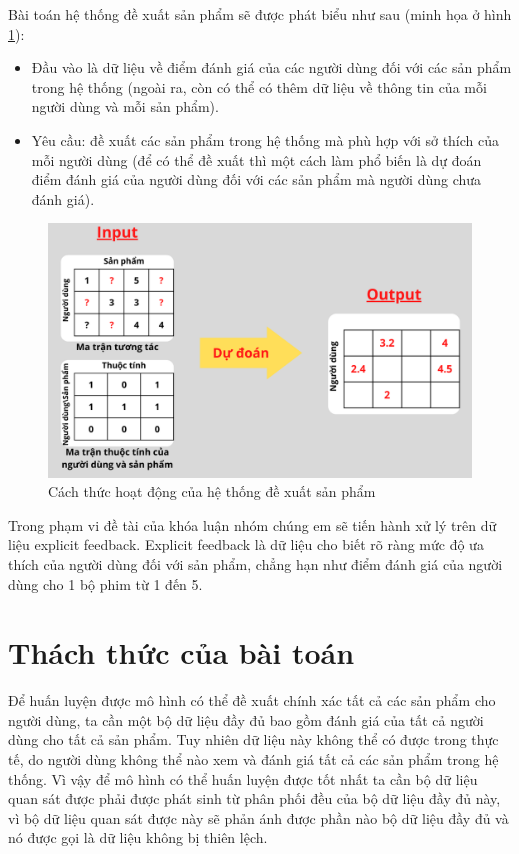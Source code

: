 Bài toán hệ thống đề xuất sản phẩm sẽ được phát biểu như sau (minh họa ở hình \ref{fig:chap1_rs}):
\begin{itemize}
    \item Đầu vào là dữ liệu về điểm đánh giá của các người dùng đối với các sản phẩm trong hệ thống (ngoài ra, còn có thể có thêm dữ liệu về thông tin của mỗi người dùng và mỗi sản phẩm).
    \item Yêu cầu: đề xuất các sản phẩm trong hệ thống mà phù hợp với sở thích của mỗi người dùng (để có thể đề xuất thì một cách làm phổ biến là dự đoán điểm đánh giá của người dùng đối với các sản phẩm mà người dùng chưa đánh giá).
\end{itemize}

\begin{figure}[h]
    \centering
    \includegraphics[width=\textwidth]{Chapter1/RS.png}
    \caption{Cách thức hoạt động của hệ thống đề xuất sản phẩm}
    \label{fig:chap1_rs}
\end{figure}

Trong phạm vi đề tài của khóa luận nhóm chúng em sẽ tiến hành xử lý trên dữ liệu explicit feedback. Explicit feedback là dữ liệu cho biết rõ ràng mức độ ưa thích của người dùng đối với sản phẩm, chẳng hạn như điểm đánh giá của người dùng cho 1 bộ phim từ 1 đến 5. 


\section{Thách thức của bài toán}
Để huấn luyện được mô hình có thể đề xuất chính xác tất cả các sản phẩm cho người dùng, ta cần một bộ dữ liệu đầy đủ bao gồm đánh giá của tất cả người dùng cho tất cả sản phẩm. Tuy nhiên dữ liệu này không thể có được trong thực tế, do người dùng không thể nào xem và đánh giá tất cả các sản phẩm trong hệ thống. Vì vậy để mô hình có thể huấn luyện được tốt nhất ta cần bộ dữ liệu quan sát được phải được phát sinh từ phân phối đều của bộ dữ liệu đầy đủ này, vì bộ dữ liệu quan sát được này sẽ phản ánh được phần nào bộ dữ liệu đầy đủ và nó được gọi là dữ liệu không bị thiên lệch. 


